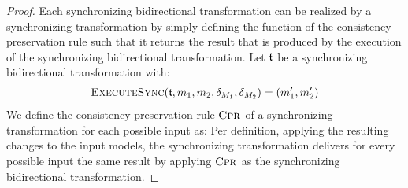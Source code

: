 \begin{proof}
    Each synchronizing bidirectional transformation can be realized by a synchronizing transformation by simply defining the function of the consistency preservation rule such that it returns the result that is produced by the execution of the synchronizing bidirectional transformation.
    Let $\transformation{t}$ be a synchronizing bidirectional transformation with:
    \begin{align*}
        \function{ExecuteSync}(\transformation{t}, \model{m}{1}, \model{m}{2}, \change{\metamodel{M}{1}}, \change{\metamodel{M}{2}}) = (\model{m}{1}', \model{m}{2}')
    \end{align*}
    We define the consistency preservation rule $\textsc{Cpr}_{}$ of a synchronizing transformation for each possible input as:
    Per definition, applying the resulting changes to the input models, the synchronizing transformation delivers for every possible input the same result by applying $\textsc{Cpr}_{}$ as the synchronizing bidirectional transformation.


\end{proof}
